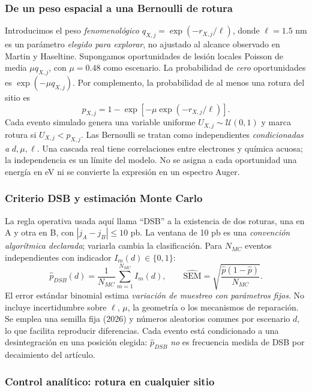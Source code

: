 \documentclass[11pt,a4paper,oneside]{article}
\begin{document}
\subsubsection{De un peso espacial a una Bernoulli de rotura}\label{de-un-peso-espacial-a-una-bernoulli-de-rotura}

Introducimos el peso \emph{fenomenológico} \(q_{X,j}=\exp(-r_{X,j}/\ell)\), donde \(\ell=1.5\) nm es un parámetro \emph{elegido para explorar}, no ajustado al alcance observado en Martin y Haseltine. Supongamos oportunidades de lesión locales Poisson de media \(\mu q_{X,j}\), con \(\mu=0.48\) como escenario. La probabilidad de \emph{cero} oportunidades es \(\exp(-\mu q_{X,j})\). Por complemento, la probabilidad de al menos una rotura del sitio es \[\boxed{p_{X,j}=1-\exp[-\mu\exp(-r_{X,j}/\ell)].}\] Cada evento simulado genera una variable uniforme \(U_{X,j}\sim\mathcal U(0,1)\) y marca rotura si \(U_{X,j}<p_{X,j}\). Las Bernoulli se tratan como independientes \emph{condicionadas a} \(d,\mu,\ell\). Una cascada real tiene correlaciones entre electrones y química acuosa; la independencia es un límite del modelo. No se asigna a cada oportunidad una energía en eV ni se convierte la expresión en un espectro Auger.

\subsubsection{Criterio DSB y estimación Monte Carlo}\label{criterio-dsb-y-estimaciuxf3n-monte-carlo}

La regla operativa usada aquí llama ``DSB'' a la existencia de dos roturas, una en A y otra en B, con \(|j_A-j_B|\leq10\) pb. La ventana de 10 pb es una \emph{convención algorítmica declarada}; variarla cambia la clasificación. Para \(N_{MC}\) eventos independientes con indicador \(I_m(d)\in\{0,1\}\): \[\widehat p_{DSB}(d)=\frac{1}{N_{MC}}\sum_{m=1}^{N_{MC}}I_m(d),\qquad
\widehat{\mathrm{SEM}}=\sqrt{\frac{\widehat p(1-\widehat p)}{N_{MC}}}.\] El error estándar binomial estima \emph{variación de muestreo con parámetros fijos}. No incluye incertidumbre sobre \(\ell\), \(\mu\), la geometría o los mecanismos de reparación. Se emplea una semilla fija (2026) y números aleatorios comunes por escenario \(d\), lo que facilita reproducir diferencias. Cada evento está condicionado a una desintegración en una posición elegida: \(\widehat p_{DSB}\) \emph{no} es frecuencia medida de DSB por decaimiento del artículo.

\subsubsection{Control analítico: rotura en cualquier sitio}\label{control-analuxedtico-rotura-en-cualquier-sitio}
\end{document}
